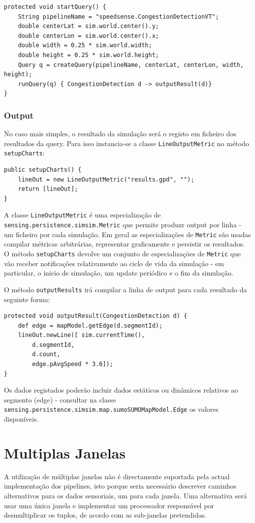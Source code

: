 \documentclass{article}
\newcommand{\tm}[1]{\texttt{#1}}
\begin{document}
\begin{Verbatim}
protected void startQuery() {
	String pipelineName = "speedsense.CongestionDetectionVT";
	double centerLat = sim.world.center().y;
	double centerLon = sim.world.center().x;
	double width = 0.25 * sim.world.width;
	double height = 0.25 * sim.world.height;
	Query q = createQuery(pipelineName, centerLat, centerLon, width, height);
	runQuery(q) { CongestionDetection d -> outputResult(d)}
}
\end{Verbatim}

\subsubsection{Output}

No caso mais simples, o resultado da simulação será o registo em ficheiro dos resultados da query. Para isso instancia-se a classe \tm{LineOutputMetric} no método \tm{setupCharts}:

\begin{Verbatim}
public setupCharts() {
	lineOut = new LineOutputMetric("results.gpd", "");
	return [lineOut];
}
\end{Verbatim}

A classe \tm{LineOutputMetric} é uma especialização de \tm{sensing.persistence.simsim.Metric} que permite produzr output por linha - um ficheiro por cada simulação.  Em geral as especializações de \tm{Metric} são usadas compilar métricas arbitrárias, representar graficamente e persistir os resultados. O método \tm{setupCharts} devolve um conjunto de especializações de \tm{Metric} que vão receber notificações relativamente ao ciclo de vida da simulação - em particular, o inicio de simulação, um update periódico e o fim da simulação.


O método \tm{outputResults} irá compilar a linha de output para cada resultado da seguinte forma:

\begin{Verbatim}
protected void outputResult(CongestionDetection d) {
	def edge = mapModel.getEdge(d.segmentId);
	lineOut.newLine([ sim.currentTime(),
		d.segmentId,
		d.count,
		edge.pAvgSpeed * 3.6]);
}
\end{Verbatim}

Os dados registados poderão incluir dados estáticos ou dinâmicos relativos ao segmento (edge) - consultar na classe \tm{sensing.persistence.simsim.map.sumoSUMOMapModel.Edge} os valores disponíveis.



\section{Multiplas Janelas}
A utilização de múltiplas janelas não é directamente suportada pela actual implementação dos pipelines, isto porque seria necessário descrever  caminhos alternativos para os dados sensoriais, um para cada janela.  Uma alternativa será usar uma única janela e implementar um processador responsável por desmultiplicar os tuplos, de acordo com as sub-janelas pretendidas. 
\end{document}
